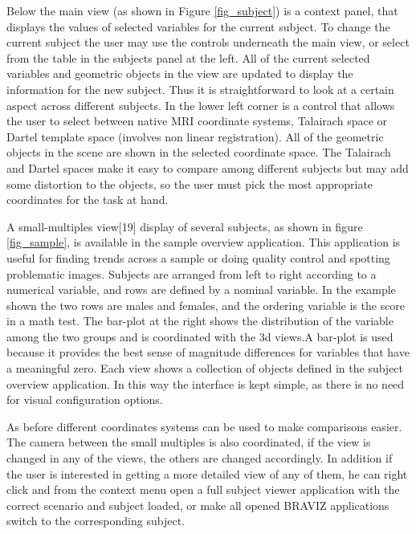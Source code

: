 \documentclass[utf8,paper]{frontiersSCNS} %
\begin{document}
Below the main view (as shown in Figure \ref{fig_subject}) is a context panel, that displays the values of selected variables for the current subject. To change the current subject the user may use the controls underneath the main view, or select from the table in the subjects panel at the left. All of the current selected variables and geometric objects in the view are updated to display the information for the new subject. Thus it is straightforward to look at a certain aspect across different subjects. In the lower left corner is a control that allows the user to select between native MRI coordinate systems, Talairach space or Dartel template space (involves non linear registration). All of the geometric objects in the scene are shown in the selected coordinate space. The Talairach and Dartel spaces make it easy to compare among different subjects but may add some distortion to the objects, so the user must pick the most appropriate coordinates for the task at hand. 

A small-multiples view[19] display of several subjects, as shown in figure \ref{fig_sample}, is available in the sample overview application. This application is useful for finding trends across a sample or doing quality control and spotting problematic images. Subjects are arranged from left to right according to a numerical variable, and rows are defined by a nominal variable. In the example shown the two rows are males and females, and the ordering variable is the score in a math test. The bar-plot at the right shows the distribution of the variable among the two groups and is coordinated with the 3d views.A bar-plot is used because it provides the best sense of magnitude differences for variables that have a meaningful zero. Each view shows a collection of objects defined in the subject overview application. In this way the interface is kept simple, as there is no need for visual configuration options.

As before different coordinates systems can be used to make comparisons easier. The camera between the small multiples is also coordinated, if the view is changed in any of the views, the others are changed accordingly. In addition if the user is interested in getting a more detailed view of any of them, he can right click and from the context menu open a full subject viewer application with the correct scenario and subject loaded, or make all opened BRAVIZ applications switch to the corresponding subject.
\end{document}
